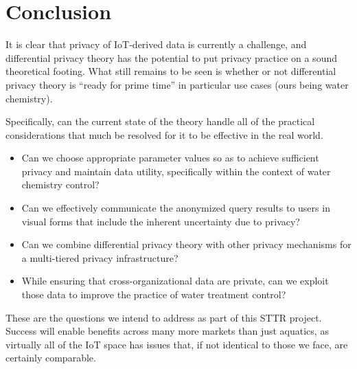 \section{Conclusion}
\label{sec:conclude}

It is clear that privacy of IoT-derived data is currently a challenge,
and differential privacy theory has the potential to put privacy practice
on a sound theoretical footing.  What still remains to be seen is whether
or not differential privacy theory is ``ready for prime time''
in particular use cases (ours being water chemistry).

Specifically, can the current state of the theory handle all of the
practical considerations that much be resolved for it to be effective
in the real world.
\begin{itemize}
\item Can we choose appropriate parameter values so as to achieve
sufficient privacy and maintain data utility, specifically
within the context of water chemistry control?
\item Can we effectively communicate the anonymized query results to
users in visual forms that include the inherent uncertainty due to privacy?
\item Can we combine differential privacy theory with other privacy
mechanisms for a multi-tiered privacy infrastructure?
\item While ensuring that cross-organizational data are private, can we
exploit those data to improve the practice of water treatment control?
\end{itemize}
These are the questions we intend to address as part of this STTR project.
Success will enable benefits across many more markets than just aquatics,
as virtually all of the IoT space has issues that, if not identical to
those we face, are certainly comparable.
